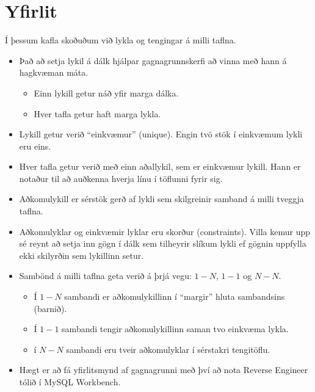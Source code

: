 \section{Yfirlit}
Í þessum kafla skoðuðum við lykla og tengingar á milli taflna.

\begin{itemize}
 \item Það að setja lykil á dálk hjálpar gagnagrunnskerfi að vinna með hann á hagkvæman máta.
 \begin{itemize}
  \item Einn lykill getur náð yfir marga dálka.
  \item Hver tafla getur haft marga lykla.
 \end{itemize}
 \item Lykill getur verið ``einkvæmur'' (unique). Engin tvö stök í einkvæmum lykli eru eins.
 \item Hver tafla getur verið með einn aðallykil, sem er einkvæmur lykill. Hann er notaður til að auðkenna hverja línu í töflunni fyrir sig.
 \item Aðkomulykill er sérstök gerð af lykli sem skilgreinir samband á milli tveggja taflna.
 \item Aðkomulyklar og einkvæmir lyklar eru skorður (constraints). Villa kemur upp sé reynt að setja inn gögn í dálk sem tilheyrir slíkum lykli ef gögnin uppfylla ekki skilyrðin sem lykillinn setur.
 \item Sambönd á milli taflna geta verið á þrjá vegu: $1-N$, $1-1$ og $N-N$.
 \begin{itemize}
  \item Í $1-N$ sambandi er aðkomulykillinn í ``margir'' hluta sambandsins (barnið).
  \item Í $1-1$ sambandi tengir aðkomulykillinn saman tvo einkvæma lykla. 
  \item í $N-N$ sambandi eru tveir aðkomulyklar í sérstakri tengitöflu.
 \end{itemize}
 \item Hægt er að fá yfirlitsmynd af gagnagrunni með því að nota Reverse Engineer tólið í MySQL Workbench.
\end{itemize}





